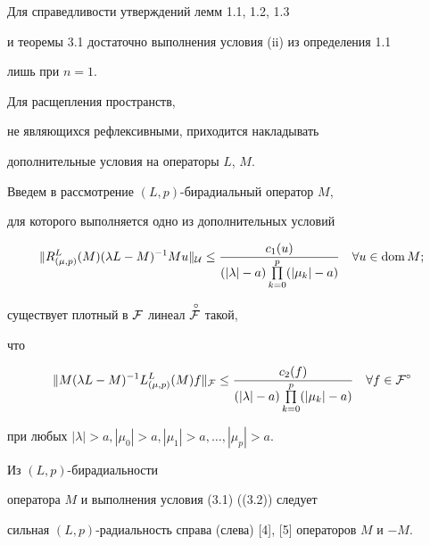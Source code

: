 \begin{notes}


Для справедливости утверждений лемм 1.1, 1.2, 1.3


и теоремы 3.1 достаточно выполнения условия (ii) из определения 1.1


лишь при $n=1$.


\end{notes}





Для расщепления пространств,


не являющихся рефлексивными, приходится накладывать


дополнительные условия на операторы $L$, $M$.


Введем в рассмотрение $(L,p)$-бирадиальный оператор $M$,


для которого выполняется одно из дополнительных условий


\begin{equation}


\| R^L_{(\mu ,p)} (M)(\lambda L-M)^{-1} Mu\|_{\cal U} \le \frac


{c_1 (u)}{(|\lambda |-a)


\prod\limits^p_{k=0} (|\mu_k|-a)} \quad \forall u \in \dom M;


\end{equation}


существует плотный в ${\cal F}$ линеал $\overset{\;\circ}{{\cal F}}{}$ такой,


что


\begin{equation}


\| M(\lambda L-M)^{-1} L^L_{(\mu ,p)} (M)f\|_{\cal F} \le


\frac{c_2 (f)}{(|\lambda |-a)


\prod\limits^p_{k=0}(|\mu_k|-a)} \quad \forall f


\in {\cal F}^\circ


\end{equation}


при любых $|\lambda |>a,|\mu_0|>a ,|\mu_1|>a ,\dotsc,|\mu_p|>a$.





\begin{notes}


Из $(L,p)$-бирадиальности


оператора $M$ и выполнения условия (3.1) ((3.2)) следует


сильная $(L,p)$-радиальность справа (слева) [4], [5] операторов $M$ и $-M$.


\end{notes}





